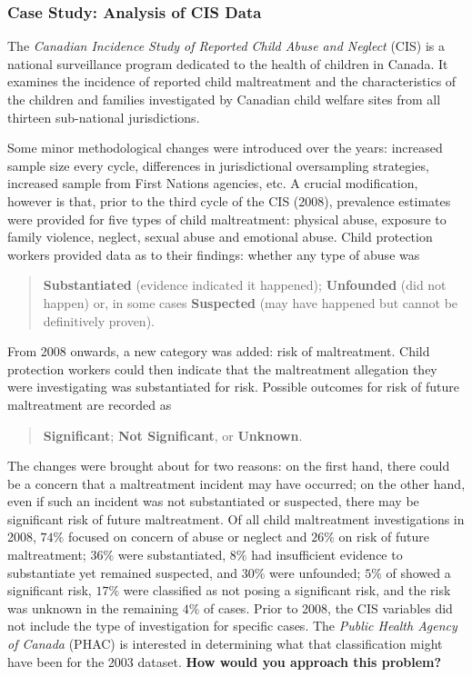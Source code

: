 \subsubsection{Case Study: Analysis of CIS Data}
The \textit{Canadian Incidence Study of Reported Child Abuse and Neglect} (CIS) is a national surveillance program dedicated to the health of children in Canada. It examines the incidence of reported child maltreatment and the characteristics of the children and families investigated by Canadian child welfare sites from all thirteen sub-national jurisdictions.
\par Some minor methodological changes were introduced over the years: increased sample size every cycle, differences in jurisdictional oversampling strategies, increased sample from First Nations agencies, etc. \newl A crucial modification, however is that, prior to the third cycle of the CIS (2008), prevalence estimates were provided for five types of child maltreatment: physical abuse, exposure to family violence, neglect, sexual abuse and emotional abuse. Child protection workers provided data as to their findings: whether any type of abuse was \begin{quote} \textbf{Substantiated} (evidence indicated it happened); \textbf{Unfounded} (did not happen) or, in some cases \textbf{Suspected} (may have happened but cannot be definitively proven). 
\end{quote}
From 2008 onwards, a new category was added: risk of maltreatment. Child protection workers could then indicate that the maltreatment allegation they were investigating was substantiated for risk. Possible outcomes for risk of future maltreatment are recorded as
\begin{quote}\textbf{Significant}; \textbf{Not Significant}, or \textbf{Unknown}. 
\end{quote}
The changes were brought about for two reasons: on the first hand, there could be a concern that a maltreatment incident may have occurred; on the other hand, even if such an incident was not substantiated or suspected, there may be significant risk of future maltreatment. Of all child maltreatment investigations in 2008, $74\%$ focused on concern of abuse or neglect and $26\%$ on risk of future maltreatment; $36\%$ were substantiated, $8\%$ had insufficient evidence to substantiate yet remained suspected, and $30\%$ were unfounded; $5\%$ of showed a significant risk, $17\%$ were classified as not posing a significant risk, and the risk was unknown in the remaining $4\%$ of cases. \newline\newline Prior to 2008, the CIS variables did not include the type of investigation for specific cases. The \textit{Public Health Agency of Canada} (PHAC) is interested in determining what that classification might have been for the 2003 dataset. \textbf{How would you approach this problem?}


